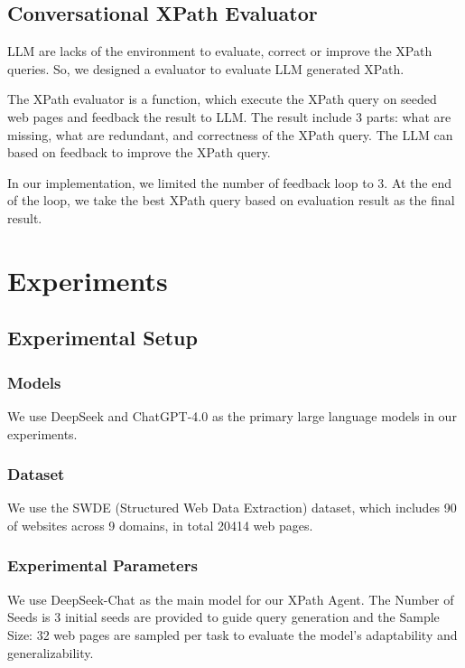 \documentclass[a4paper]{article}
\begin{document}
\subsection{Conversational XPath Evaluator}

LLM are lacks of the environment to evaluate, correct or improve the XPath queries. So, we designed a evaluator to evaluate LLM generated XPath.

The XPath evaluator is a function, which execute the XPath query on seeded web pages and feedback the result to LLM. The result include 3 parts: what are missing, what are redundant, and correctness of the XPath query. The LLM can based on feedback to improve the XPath query.

In our implementation, we limited the number of feedback loop to 3. At the end of the loop, we take the best XPath query based on evaluation result as the final result.


\section{Experiments }

\subsection{Experimental Setup}

\subsubsection{Models}
We use DeepSeek and ChatGPT-4.0 as the primary large language models in our experiments.

\subsubsection{Dataset}
We use the SWDE \cite{abdin2024phi3technicalreporthighly} (Structured Web Data Extraction) dataset, which includes 90 of websites across 9 domains, in total 20414 web pages.

\subsubsection{Experimental Parameters}
We use DeepSeek-Chat as the main model for our XPath Agent. The Number of Seeds is 3 initial seeds are provided to guide query generation and the 
Sample Size: 32 web pages are sampled per task to evaluate the model’s adaptability and generalizability.
\end{document}
